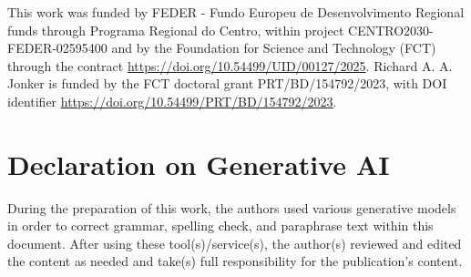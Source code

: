 \documentclass[
]{ceurart}
\begin{document}
\begin{acknowledgments}
  This work was funded by FEDER - Fundo Europeu de Desenvolvimento Regional funds through Programa Regional do Centro, within project CENTRO2030-FEDER-02595400 and by the Foundation for Science and Technology (FCT) through the contract \url{https://doi.org/10.54499/UID/00127/2025}. Richard A. A. Jonker is funded by the FCT doctoral grant PRT/BD/154792/2023,
  with DOI identifier \url{https://doi.org/10.54499/PRT/BD/154792/2023}.
\end{acknowledgments}

\section*{Declaration on Generative AI}

During the preparation of this work, the authors used various generative models in order to correct grammar, spelling check, and paraphrase text within this document. After using these tool(s)/service(s), the author(s) reviewed and edited the content as needed and take(s) full responsibility for the publication’s content.





\end{document}
